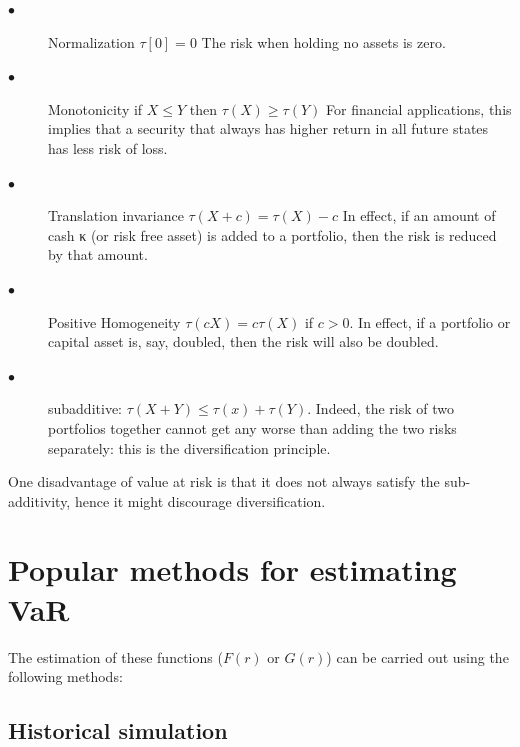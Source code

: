 \documentclass[a4paper,11pt,oneside]{book}
\begin{document}
\begin{description}
	\item[$\bullet$] Normalization \newline $\tau[0] = 0$ \newline The risk when holding no assets is zero.
	\item[$\bullet$] Monotonicity \newline if $X \leq Y$ then $\tau(X) \geq \tau(Y)$ \newline For financial applications, this implies that a
	security that always has higher return in all future states has less risk of loss.
	
	\item[$\bullet$] Translation invariance
	\newline  $\tau(X+c) = \tau(X)-c$ \newline In effect, if an amount of cash κ (or risk free asset)
	is added to a portfolio, then the risk is reduced by that amount.
	\item[$\bullet$] Positive Homogeneity
	\newline $\tau(cX) = c\tau(X)$ if $c>0$. \newline In effect, if a portfolio or capital asset is, say,
	doubled, then the risk will also be doubled.
	
		\item[$\bullet$] subadditive: 
	\newline $\tau(X+Y)\leq \tau(x)+\tau(Y)$. 
	Indeed, the risk of two portfolios together cannot get any worse than adding the two risks separately: this is the diversification principle.
	
\end{description}
One disadvantage of value at risk is that it does not always satisfy the sub-additivity, hence it might discourage diversification.

\section{Popular methods for estimating VaR}
The estimation of these functions ($F(r)$ or $G(r)$) can be carried out using the
following methods:

\subsection{Historical simulation}
\end{document}

